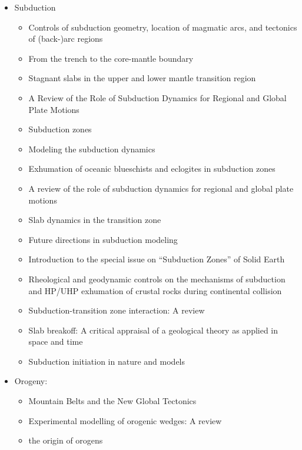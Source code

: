 \begin{itemize}

\item Subduction
   \begin{itemize}
   \item [\nineteeneightytwo] Controls of subduction geometry, location of magmatic arcs, 
         and tectonics of (back-)arc regions \cite{crpi82}
   \item [\nineteenninetyfive] From the trench to the core-mantle boundary \cite{kinc95}
   \item [\twothousandone] Stagnant slabs in the upper and lower mantle transition region \cite{fuwo01}
   \item [\twothousandone] A Review of the Role of Subduction Dynamics for Regional and Global Plate Motions \cite{befa09}
   \item [\twothousandtwo] Subduction zones \cite{ster02}
   \item [\twothousandeight] Modeling the subduction dynamics \cite{bill08}
   \item [\twothousandnine] Exhumation of oceanic blueschists and eclogites in subduction zones \cite{agyj09}
   \item [\twothousandnine] A review of the role of subduction dynamics for regional and global plate motions \cite{befa09}
   \item [\twothousandten] Slab dynamics in the transition zone \cite{bill10}
   \item [\twothousandeleven] Future directions in subduction modeling \cite{gery11}
   \item [\twothousandthirteen] Introduction to the special issue on “Subduction Zones” of Solid Earth \cite{bufv13}
   \item [\twothousandfourteen] Rheological and geodynamic controls on the mechanisms of subduction and HP/UHP exhumation 
                of crustal rocks during continental collision \cite{bufa14,bufy14b}
   \item [\twothousandseventeen] Subduction-transition zone interaction: A review \cite{goav17}
   \item [\twothousandeighteen] Slab breakoff: A critical appraisal of a geological theory as applied in space and time \cite{garm18}
   \item [\twothousandeighteen] Subduction initiation in nature and models \cite{stge18}
   \end{itemize}

\item Orogeny:
   \begin{itemize}
   \item [\nineteenseventy] Mountain Belts and the New Global Tectonics  \cite{debi70}
   \item [\twothousandtwelve] Experimental modelling of orogenic wedges: A review \cite{grmd12} 
   \item [\twothousandthirteen] the origin of orogens \cite{jabe13}
   \end{itemize}


\end{itemize}
